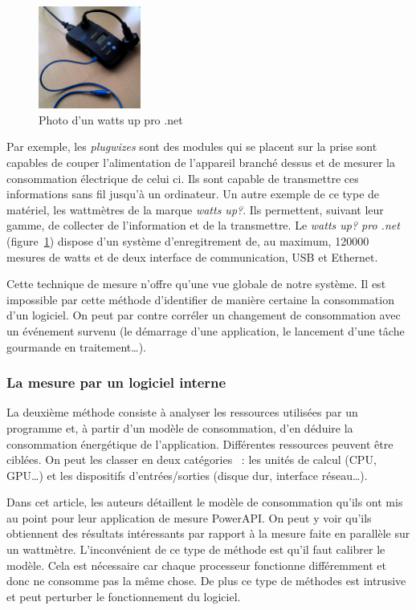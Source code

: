 \documentclass[a4paper, 11pt]{report}
\begin{document}
\begin{figure}
		\includegraphics[width=0.3\textwidth]{figures/wattsUp}
		\caption{Photo d'un watts up pro .net}
		\label{wattsUp}
\end{figure}

Par exemple, les \textit{plugwizes} sont des modules qui se placent sur la prise sont capables de couper l'alimentation de l'appareil branché dessus et de mesurer la consommation électrique de celui ci. Ils sont capable de transmettre ces informations sans fil jusqu'à un ordinateur. Un autre exemple de ce type de matériel, les wattmètres de la marque \textit{watts up\/?}. Ils permettent, suivant leur gamme, de collecter de l'information et de la transmettre. Le \textit{watts up\/? pro .net} (figure~\ref{wattsUp}) dispose d'un système d'enregitrement de, au maximum, 120000 mesures de watts et de deux interface de communication, USB et Ethernet.

Cette technique de mesure n'offre qu'une vue globale de notre système. Il est impossible par cette méthode d'identifier de manière certaine la consommation d'un logiciel. On peut par contre corréler un changement de consommation avec un événement survenu\cite{GreenMining} (le démarrage d'une application, le lancement d'une tâche gourmande en traitement\ldots). 

			\subsubsection{La mesure par un logiciel interne}
La deuxième méthode consiste à analyser les ressources utilisées par un programme et, à partir d'un modèle de consommation, d'en déduire la consommation énergétique de l'application. Différentes ressources peuvent être ciblées. On peut les classer en deux catégories ~: les unités de calcul (CPU, GPU\ldots) et les dispositifs d'entrées/sorties (disque dur, interface réseau\ldots).

Dans cet article\cite{noureddine:hal-00681560}, les auteurs détaillent le modèle de consommation qu'ils ont mis au point pour leur application de mesure PowerAPI. On peut y voir qu'ils obtiennent des résultats intéressants par rapport à la mesure faite en parallèle sur un wattmètre. L'inconvénient de ce type de méthode est qu'il faut calibrer le modèle. Cela est nécessaire car chaque processeur  fonctionne différemment et donc ne consomme pas la même chose. De plus ce type de méthodes est intrusive et peut perturber le fonctionnement du logiciel.
\end{document}
